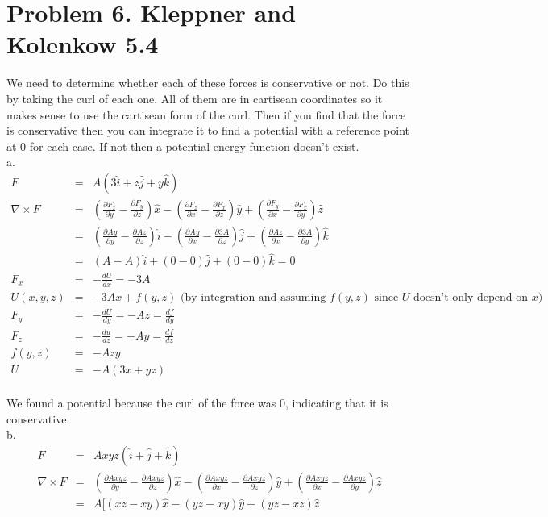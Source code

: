 \documentclass[11pt]{amsart}
\begin{document}
\section{Problem 6. Kleppner and Kolenkow 5.4}
We need to determine whether each of these forces is conservative or not. Do this by taking the curl of each one. All of them are in cartisean coordinates so it makes sense to use the cartisean form of the curl. Then if you find that the force is conservative then you can integrate it to find a potential with a reference point at 0 for each case. If not then a potential energy function doesn't exist. \\ 
a.  \\
\begin{eqnarray*}
F &=& A(3\hat{i}+z\hat{j}+y\hat{k}) \\
\nabla \times F &=& 
\left(\frac{\partial{F_{z}}}{\partial{y}}-\frac{\partial{F_{y}}}{\partial{z}}\right)\hat{x}
-\left(\frac{\partial{F_{z}}}{\partial{x}}-\frac{\partial{F_{x}}}{\partial{z}}\right)\hat{y}
+\left(\frac{\partial{F_{y}}}{\partial{x}}-\frac{\partial{F_{x}}}{\partial{y}}\right)\hat{z} \\
&=& \left(\frac{\partial{Ay}}{\partial{y}}-\frac{\partial{Az}}{\partial{z}}\right)\hat{i}
-\left(\frac{\partial{Ay}}{\partial{x}}-\frac{\partial{3A}}{\partial{z}}\right)\hat{j}
+\left(\frac{\partial{Az}}{\partial{x}}-\frac{\partial{3A}}{\partial{y}}\right)\hat{k} \\
&=& (A-A)\hat{i}+(0-0)\hat{j}+(0-0)\hat{k} = 0\\
F_{x} &=& -\frac{dU}{dx} = -3A \\
U(x,y,z) &=& -3Ax+f(y,z) \mbox{ (by integration and assuming $f(y,z)$ since $U$ doesn't only depend on $x$)} \\
F_{y} &=& -\frac{dU}{dy} = -Az =\frac{df}{dy} \\
F_{z} &=& -\frac{du}{dz} = -Ay =\frac{df}{dz} \\
f(y,z) &=& -Azy \\
U &=& -A(3x+yz) 
\end{eqnarray*} \\
We found a potential because the curl of the force was 0, indicating that it is conservative. \\
b.  \\
\begin{eqnarray*}
F &=& Axyz(\hat{i}+\hat{j}+\hat{k}) \\
\nabla \times F &=& 
\left(\frac{\partial{Axyz}}{\partial{y}}-\frac{\partial{Axyz}}{\partial{z}}\right)\hat{x}
-\left(\frac{\partial{Axyz}}{\partial{x}}-\frac{\partial{Axyz}}{\partial{z}}\right)\hat{y}
+\left(\frac{\partial{Axyz}}{\partial{x}}-\frac{\partial{Axyz}}{\partial{y}}\right)\hat{z} \\
&=&A[(xz-xy)\hat{x}-(yz-xy)\hat{y}+(yz-xz)\hat{z} 
\end{eqnarray*} \\
\end{document}
